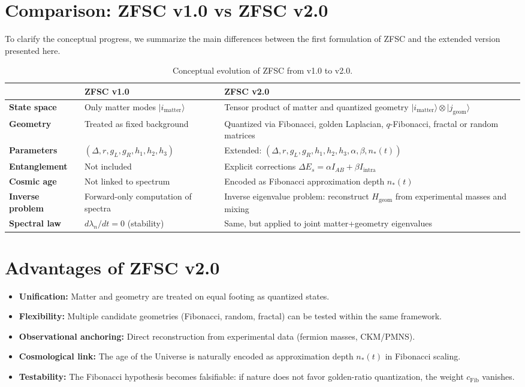 \documentclass[12pt,a4paper]{article}
\begin{document}
\section{Comparison: ZFSC v1.0 vs ZFSC v2.0}

To clarify the conceptual progress, we summarize the main differences between the first formulation of ZFSC and the extended version presented here.

\begin{table}[h!]
\centering
\begin{tabular}{@{}p{4cm}p{5.5cm}p{5.5cm}@{}}
\toprule
 & \textbf{ZFSC v1.0} & \textbf{ZFSC v2.0} \\
\midrule
\textbf{State space} & Only matter modes $|i_{\mathrm{matter}}\rangle$ & Tensor product of matter and quantized geometry $|i_{\mathrm{matter}}\rangle \otimes |j_{\mathrm{geom}}\rangle$ \\
\textbf{Geometry} & Treated as fixed background & Quantized via Fibonacci, golden Laplacian, $q$-Fibonacci, fractal or random matrices \\
\textbf{Parameters} & $(\Delta, r, g_L, g_R, h_1,h_2,h_3)$ & Extended: $(\Delta, r, g_L, g_R, h_1,h_2,h_3, \alpha, \beta, n_*(t))$ \\
\textbf{Entanglement} & Not included & Explicit corrections $\Delta E_s = \alpha I_{AB} + \beta I_{\mathrm{intra}}$ \\
\textbf{Cosmic age} & Not linked to spectrum & Encoded as Fibonacci approximation depth $n_*(t)$ \\
\textbf{Inverse problem} & Forward-only computation of spectra & Inverse eigenvalue problem: reconstruct $H_{\mathrm{geom}}$ from experimental masses and mixing \\
\textbf{Spectral law} & $d\lambda_n/dt = 0$ (stability) & Same, but applied to joint matter+geometry eigenvalues \\
\bottomrule
\end{tabular}
\caption{Conceptual evolution of ZFSC from v1.0 to v2.0.}
\end{table}

\section{Advantages of ZFSC v2.0}
\begin{itemize}
    \item \textbf{Unification:} Matter and geometry are treated on equal footing as quantized states.  
    \item \textbf{Flexibility:} Multiple candidate geometries (Fibonacci, random, fractal) can be tested within the same framework.  
    \item \textbf{Observational anchoring:} Direct reconstruction from experimental data (fermion masses, CKM/PMNS).  
    \item \textbf{Cosmological link:} The age of the Universe is naturally encoded as approximation depth $n_*(t)$ in Fibonacci scaling.  
    \item \textbf{Testability:} The Fibonacci hypothesis becomes falsifiable: if nature does not favor golden-ratio quantization, the weight $c_{\mathrm{Fib}}$ vanishes.  
\end{itemize}
\end{document}
